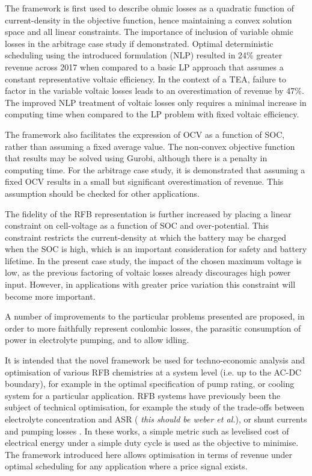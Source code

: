 \documentclass[preprint,3p,review,authoryear,10pt]{elsarticle}
\begin{document}
The framework is first used to describe ohmic losses as a quadratic function of current-density in the objective function, hence maintaining a convex solution space and all linear constraints. The importance of inclusion of variable ohmic losses in the arbitrage case study if demonstrated. Optimal deterministic scheduling using the introduced formulation (NLP) resulted in 24\% greater revenue across 2017 when compared to a basic LP approach that assumes a constant representative voltaic efficiency. In the context of a TEA, failure to factor in the variable voltaic losses leads to an overestimation of revenue by 47\%. The improved NLP treatment of voltaic losses only requires a minimal increase in computing time when compared to the LP problem with fixed voltaic efficiency. 

The framework also facilitates the expression of OCV as a function of SOC, rather than assuming a fixed average value. The non-convex objective function that results may be solved using Gurobi, although there is a penalty in computing time. For the arbitrage case study, it is demonstrated that assuming a fixed OCV results in a small but significant overestimation of revenue. This assumption should be checked for other applications.

The fidelity of the RFB representation is further increased by placing a linear constraint on cell-voltage as a function of SOC and over-potential. This constraint restricts the current-density at which the battery may be charged when the SOC is high, which is an important consideration for safety and battery lifetime. In the present case study, the impact of the chosen maximum voltage is low, as the previous factoring of voltaic losses already discourages high power input. However, in applications with greater price variation this constraint will become more important. 

A number of improvements to the particular problems presented are proposed, in order to more faithfully represent coulombic losses, the parasitic consumption of power in electrolyte pumping, and to allow idling.

It is intended that the novel framework be used for techno-economic analysis and optimisation of various RFB chemistries at a system level (i.e. up to the AC-DC boundary), for example in the optimal specification of pump rating, or cooling system for a particular application. RFB systems have previously been the subject of technical optimisation, for example the study of the trade-offs between electrolyte concentration and ASR (\cite{Weber2013} \emph{this should be weber et al.}), or shunt currents and pumping losses \citep{Viswanathan2014}. In these works, a simple metric such as levelised cost of electrical energy under a simple duty cycle is used as the objective to minimise. The framework introduced here allows optimisation in terms of revenue under optimal scheduling for any application where a price signal exists.
\end{document}
